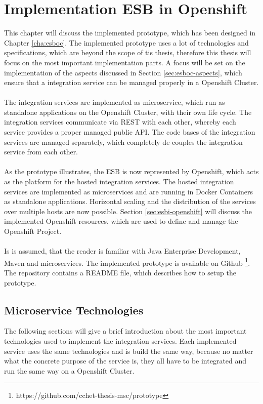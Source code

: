 \chapter{Implementation ESB in Openshift}
\label{cha:esbi}
This chapter will discuss the implemented prototype, which has been designed in Chapter \vref{cha:esboc}. The implemented prototype uses a lot of technologies and specifications, which are beyond the scope of tis thesis, therefore this thesis will focus on the most important implementation parts. A focus will be set on the implementation of the aspects discussed in Section \vref{sec:esboc-aspects}, which ensure that a integration service can be managed properly in a Openshift Cluster. 
\\ \\
The integration services are implemented as microservice, which run as standalone applications on the Openshift Cluster, with their own life cycle. The integration services communicate via REST with each other, whereby each service provides a proper managed public API. The code bases of the integration services are managed separately, which completely de-couples the integration service from each other.  
\\ \\
As the prototype illustrates, the ESB is now represented by Openshift, which acts as the platform for the hosted integration services. The hosted integration services are implemented as microservices and are running in Docker Containers as standalone applications. Horizontal scaling and the distribution of the services over multiple hosts are now possible. Section \vref{sec:esbi-openshift} will discuss the implemented Openshift resources, which are used to define and manage the Openshift Project.
\\ \\
Is is assumed, that the reader is familiar with Java Enterprise Development, Maven and microservices. The implemented prototype is available on Github \footnote{https://github.com/cchet-thesis-msc/prototype}. The repository contains a README file, which describes how to setup the prototype. 

\section{Microservice Technologies}
\label{sec:esbi-technolody-fis}
The following sections will give a brief introduction about the most important technologies used to implement the integration services. Each implemented service uses the same technologies and is build the same way, because no matter what the concrete purpose of the service is, they all have to be integrated and run the same way on a Openshift Cluster.

